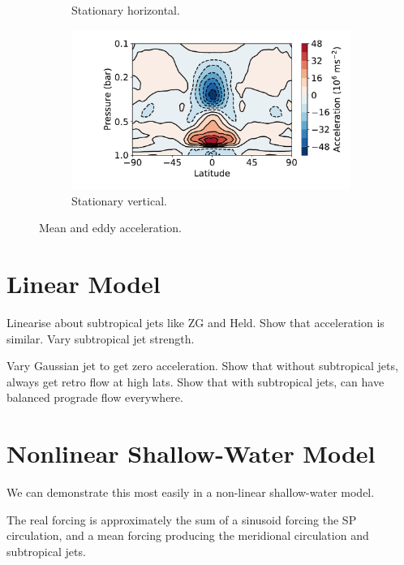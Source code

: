 \begin{figure}
\begin{subfigure}[t]{0.45\textwidth}
    \caption{Stationary horizontal.}
  \end{subfigure}
  \begin{subfigure}[t]{0.45\textwidth}
    \includegraphics[width=\textwidth]{figures/eqm-zonal-flow/3_flux.pdf}
    \caption{Stationary vertical.}
  \end{subfigure}
  \caption{Mean and eddy acceleration.}
  \label{fig:default-gcm-accelerations}
\end{figure}







\section{Linear Model}

Linearise about subtropical jets like ZG and Held. Show that acceleration is similar. Vary subtropical jet strength.

Vary Gaussian jet to get zero acceleration. Show that without subtropical jets, always get retro flow at high lats. Show that with subtropical jets, can have balanced prograde flow everywhere.

\section{Nonlinear Shallow-Water Model}

We can demonstrate this most easily in a non-linear shallow-water model.

The real forcing is approximately the sum of a sinusoid forcing the SP circulation, and a mean forcing producing the meridional circulation and subtropical jets.

